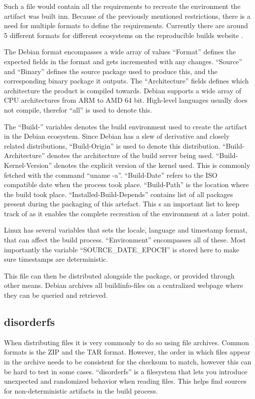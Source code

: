 \documentclass[../Main/thesis.tex]{subfiles}
\begin{document}
Such a file would contain all the requirements to recreate the environment the
artifact was built inn. Because of the previously mentioned restrictions, there
is a need for multiple formats to define the requirements. Currently there are
around 5 different formats for different ecosystems on the reproducible builds
website \cite{reproducible-builds-2019}.


The Debian format encompasses a wide array of values ``Format'' defines
the expected fields in the format and gets incremented with any changes.
``Source'' and ``Binary'' defines the source package used to produce this, and
the corresponding binary package it outputs. The ``Architecture'' fields defines
which architecture the product is compiled towards. Debian supports a wide array
of CPU architectures from ARM to AMD 64 bit. High-level languages usually does
not compile, therefor ``all'' is used to denote this.

The ``Build-'' variables denotes the build environment used to create the
artifact in the Debian ecosystem. Since Debian has a slew of derivative and
closely related distributions, ``Build-Origin'' is used to denote this
distribution.  ``Build-Architecture'' denotes the architecture of the build
server being used.  ``Build-Kernel-Version'' denotes the explicit  version of
the kernel used. This is commonly fetched with the command ``uname -a''.
``Build-Date'' refers to the ISO compatible date when the process took place.
``Build-Path'' is the location where the build took place.
``Installed-Build-Depends'' contains list of all packages present during the
packaging of this artefact. This s an important list to keep track of as it
enables the complete recreation of the environment at a later point.

Linux has several variables that sets the locale, language and timestamp format,
that can affect the build process. ``Environment'' encompasses all of these.
Most importantly the variable ``SOURCE\_DATE\_EPOCH'' is stored here to make sure
timestamps are deterministic.

This file can then be distributed alongside the package, or provided through
other means. Debian archives all buildinfo-files on a centralized webpage where
they can be queried and retrieved.


\subsection*{disorderfs}
When distributing files it is very commonly to do so using file archives. Common
formats is the ZIP and the TAR format. However, the order in which files appear
in the archive needs to be consistent for the checksum to match, however this
can be hard to test in some cases. ``disorderfs'' is a filesystem that lets you
introduce unexpected and randomized behavior when reading files. This helps find
sources for non-deterministic artifacts in the build process.
\end{document}

